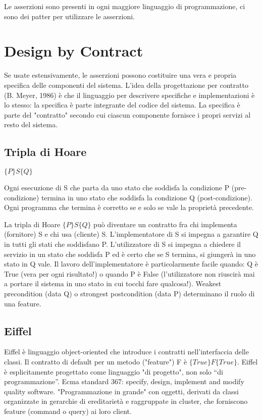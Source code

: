 \documentclass[a4paper,12pt,titlepage,oneside]{book}
\begin{document}
    Le asserzioni sono presenti in ogni maggiore linguaggio di programmazione, ci sono dei patter per utilizzare le asserzioni.

\chapter{Design by Contract}
    Se usate estensivamente, le asserzioni possono costituire una vera e propria specifica delle componenti del sistema.
    L'idea della progettazione per contratto (B. Meyer, 1986) è che il linguaggio per descrivere specifiche e implementazioni è lo stesso: la specifica è parte integrante del codice del sistema.
    La specifica è parte del "contratto" secondo cui ciascun componente fornisce i propri servizi al resto del sistema.

\section{Tripla di Hoare}
$\{P\}S\{Q\}$

    Ogni esecuzione di S che parta da uno stato che soddisfa la condizione P (pre-condizione) termina in uno stato che soddisfa la condizione Q (post-condizione).
    Ogni programma che termina è corretto se e solo se vale la proprietà precedente.

    La tripla di Hoare $\{P\}S\{Q\}$ può diventare un contratto fra chi implementa (fornitore) S e chi usa (cliente) S.
    L'implementatore di S si impegna a garantire Q in tutti gli stati che soddisfano P.
    L'utilizzatore di S si impegna a chiedere il servizio in un stato che soddisfa P ed è certo che se S termina, si giungerà in uno stato in Q vale.
    Il lavoro dell'implementatore è particolarmente facile quando: Q è True (vera per ogni risultato!) o quando P è False (l’utilizzatore non riuscirà mai a portare il sistema in uno stato in cui tocchi fare qualcosa!). 
    Weakest precondition (data Q) o strongest postcondition (data P) determinano il ruolo di una feature.

\section{Eiffel}
    Eiffel è linguaggio object-oriented che introduce i contratti nell'interfaccia delle classi. Il contratto di default per un metodo ("feature") F è $\{True\}F\{True\}$.
    Eiffel è esplicitamente progettato come linguaggio "di progetto", non solo “di programmazione”.
    Ecma standard 367: specify, design, implement and modify quality software.
    "Programmazione in grande" con oggetti, derivati da classi organizzate in gerarchie di ereditarietà e raggruppate in cluster, che forniscono feature (command o query) ai loro client.
\end{document}
